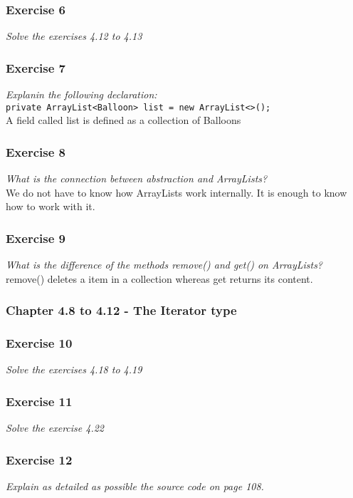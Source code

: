 \subsubsection*{Exercise 6}
\textit{Solve the exercises 4.12 to 4.13}\\

\subsubsection*{Exercise 7}
\textit{Explanin the following declaration:}\\
\lstinline?private ArrayList<Balloon> list = new ArrayList<>();?\\
A field called list is defined as a collection of Balloons

\subsubsection*{Exercise 8}
\textit{What is the connection between abstraction and ArrayLists?}\\
We do not have to know how ArrayLists work internally. It is enough to know 
how to work with it. 

\subsubsection*{Exercise 9}
\textit{What is the difference of the methods remove() and get() on
ArrayLists?}\\
remove() deletes a item in a collection whereas get returns its content. 

\subsubsection{Chapter 4.8 to 4.12 - The Iterator type}

\subsubsection*{Exercise 10}
\textit{Solve the exercises 4.18 to 4.19}\\

\subsubsection*{Exercise 11}
\textit{Solve the exercise 4.22}\\

\subsubsection*{Exercise 12}
\textit{Explain as detailed as possible the source code on page 108.}\\

